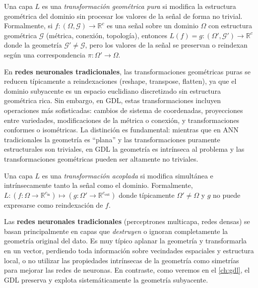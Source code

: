 \begin{definition}\label{def:geometry_transform}
	Una capa $L$ es una \textit{transformación geométrica pura} si modifica la estructura geométrica del dominio sin procesar los valores de la señal de forma no trivial. Formalmente, si $f: (\Omega, \mathcal{G}) \to \mathbb{R}^c$ es una señal sobre un dominio $\Omega$ con estructura geométrica $\mathcal{G}$ (métrica, conexión, topología), entonces $L(f) = g: (\Omega', \mathcal{G}') \to \mathbb{R}^c$ donde la geometría $\mathcal{G}' \neq \mathcal{G}$, pero los valores de la señal se preservan o reindexan según una correspondencia $\pi: \Omega' \to \Omega$.
\end{definition}

En \textbf{redes neuronales tradicionales}, las transformaciones geométricas puras se reducen típicamente a reindexaciones (reshape, transpose, flatten), ya que el dominio subyacente es un espacio euclidiano discretizado sin estructura geométrica rica. Sin embargo, en \gls{GDL}, estas transformaciones incluyen operaciones más sofisticadas: cambios de sistema de coordenadas, proyecciones entre variedades, modificaciones de la métrica o conexión, y transformaciones conformes o isométricas. La distinción es fundamental: mientras que en \gls{ANN} tradicionales la geometría es ``plana'' y las transformaciones puramente estructurales son triviales, en \gls{GDL} la geometría es intrínseca al problema y las transformaciones geométricas pueden ser altamente no triviales.

\begin{definition}\label{def:coupled_transform}
	Una capa $L$ es una \textit{transformación acoplada} si modifica simultánea e intrínsecamente tanto la señal como el dominio. Formalmente, $L: (f: \Omega \to \mathbb{R}^{c_{\text{in}}}) \mapsto (g: \Omega' \to \mathbb{R}^{c_{\text{out}}})$ donde típicamente $\Omega' \neq \Omega$ y $g$ no puede expresarse como reindexación de $f$.
\end{definition}

Las \textbf{redes neuronales tradicionales} (perceptrones multicapa, redes densas) se basan principalmente en capas que \textit{destruyen} o ignoran completamente la geometría original del dato. Es muy típico aplanar la geometría y transformarla en un vector, perdiendo toda información sobre vecindades espaciales y estructura local, o no utilizar las propiedades intrínsecas de la geometría como simetrías para mejorar las redes de neuronas. En contraste, como veremos en el \autoref{ch:gdl}, el \gls{GDL} preserva y explota sistemáticamente la geometría subyacente.

